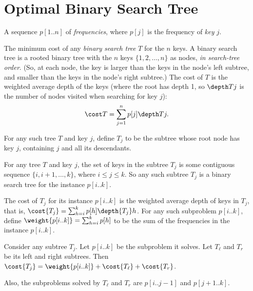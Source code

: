 
\section{Optimal Binary Search Tree}\label{dp: sec: optimal BST}

\begin{mylist}
\item[\bf input:]
  A sequence $p[1..n]$ of \emph{frequencies},
  where $p[j]$ is the frequency of \emph{key} $j$.
  
\item[\bf output:]
  The minimum cost of any \emph{binary search tree} $T$ for the $n$ keys.
  A binary search tree is a rooted binary tree with the $n$ keys $\{1,2,\ldots,n\}$
  as nodes, \emph{in search-tree order}.  (So, at each node,
  the key is larger than the keys in the node's left subtree,
  and smaller than the keys in the node's right subtree.)
  The cost of $T$ is the weighted average depth of the keys
  (where the root has depth 1, so $\depth T j$ is the number of nodes visited when searching for key $j$):
  \[\cost T = \sum_{j=1}^n p[j] \depth T j.\]
\end{mylist}

For any such tree $T$ and key $j$, define $T_j$ to be the subtree
whose root node has key $j$, containing $j$ and all its descendants.

\begin{observation}\label{dp: subtree}
  For any tree $T$ and key $j$,
  the set of keys in the subtree $T_j$
  is some contiguous sequence $\{i, i+1, \ldots, k\}$,
  where $i\le j \le k$.
  So any such subtree $T_j$ is a binary search tree
  for the  instance $p[i..k]$.
\end{observation}
The cost of $T_j$ for its instance $p[i..k]$
is the weighted average depth of keys in $T_j$,
that is,
\(\cost {T_j} = \sum_{h=i}^k p[h] \depth {T_j} h\).
For any such subproblem $p[i..k]$,
define $\weight {p[i..k]} = \sum_{h=i}^k p[h]$
to be the sum of the frequencies in the instance $p[i..k]$.

\begin{observation}\label{dp: tree cost}
  Consider any subtree $T_j$.  Let $p[i..k]$ be the subproblem it solves.
  Let $T_\ell$ and $T_r$ be its left and right subtrees.
  Then $\cost {T_j} = \weight {p[i..k]} + \cost {T_\ell} + \cost {T_r}$.

  Also, the subproblems solved by $T_\ell$ and $T_r$
  are $p[i..j-1]$ and $p[j+1..k]$.
\end{observation}

